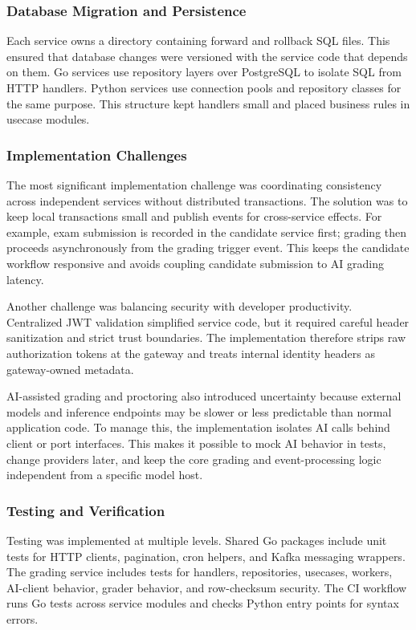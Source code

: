 \subsubsection{Database Migration and Persistence}
Each service owns a  directory containing forward and rollback SQL files. This ensured that database changes were versioned with the service code that depends on them. Go services use repository layers over PostgreSQL to isolate SQL from HTTP handlers. Python services use  connection pools and repository classes for the same purpose. This structure kept handlers small and placed business rules in usecase modules.

\subsubsection{Implementation Challenges}
The most significant implementation challenge was coordinating consistency across independent services without distributed transactions. The solution was to keep local transactions small and publish events for cross-service effects. For example, exam submission is recorded in the candidate service first; grading then proceeds asynchronously from the grading trigger event. This keeps the candidate workflow responsive and avoids coupling candidate submission to AI grading latency.

Another challenge was balancing security with developer productivity. Centralized JWT validation simplified service code, but it required careful header sanitization and strict trust boundaries. The implementation therefore strips raw authorization tokens at the gateway and treats internal identity headers as gateway-owned metadata.

AI-assisted grading and proctoring also introduced uncertainty because external models and inference endpoints may be slower or less predictable than normal application code. To manage this, the implementation isolates AI calls behind client or port interfaces. This makes it possible to mock AI behavior in tests, change providers later, and keep the core grading and event-processing logic independent from a specific model host.

\subsubsection{Testing and Verification}
Testing was implemented at multiple levels. Shared Go packages include unit tests for HTTP clients, pagination, cron helpers, and Kafka messaging wrappers. The grading service includes tests for handlers, repositories, usecases, workers, AI-client behavior, grader behavior, and row-checksum security. The CI workflow runs Go tests across service modules and checks Python entry points for syntax errors.

